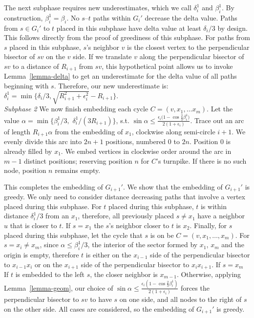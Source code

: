 \documentclass[11pt]{article}
\begin{document}
The next subphase requires new underestimates, which we call $\delta^1_{i}$ 
and $\beta^1_i$. By construction, $\beta^1_i = \beta_i$. 
No $s$--$t$ paths within $G_i'$ decrease the delta value.
Paths from $s\in G_i'$ to $t$ placed in this subphase have delta value at 
least $\delta_i/3$ by design.
\ifFull This follows directly from the proof of greediness of this 
subphase.\fi
For paths from $s$ placed in this subphase, $s$'s neighbor $v$ is 
the closest vertex to the perpendicular bisector 
of $sv$ on the $v$ side. If we translate $v$ along the perpendicular bisector of $sv$ 
to a distance of $R_{i+1}$ from $sv$, this hypothetical point allows us to invoke 
Lemma~\ref{lemma-delta} to get an underestimate for the delta value of all 
paths beginning with $s$. Therefore, our new underestimate is: 
$\delta^1_{i} = \min\{\delta_i/3, \sqrt{R_{i+1}^2 + \epsilon_i^2} - R_{i+1}\}$.\\ 

\noindent\emph{Subphase 2} We now finish embedding each cycle 
$C = (v, x_1,\ldots x_m)$. Let the value $\alpha = \min\{\beta^1_{i}/3,$ $\delta^1_{i}/(3R_{i+1})\}$, 
s.t. $\sin{\alpha} \leq 
\frac{\epsilon_i(1-\cos{\frac{2}{3}\beta^1_i)}}{2(1+\epsilon_i)}$.  
Trace out an arc of length $R_{i+1}\alpha$ from the embedding of $x_1$, clockwise
along semi-circle $i+1$. We evenly divide this arc into $2n+1$ 
positions, numbered $0$ to $2n$. Position $0$ is already filled by $x_1$. 
We embed vertices in clockwise order around the arc in $m-1$ 
distinct positions; reserving position $n$ for $C$'s turnpike. If 
there is no such node, position $n$ remains empty.

This completes the embedding of $G_{i+1}'$. We show that the embedding of 
$G_{i+1}'$ is greedy. We only need to consider distance decreasing paths 
that involve a vertex placed during this subphase. For $t$ placed during
this subphase, $t$ is within distance $\delta^1_{i}/3$ from an $x_1$, 
therefore, all previously placed $s \neq x_1$ have a neighbor $u$ that is closer 
to $t$. If $s=x_1$ the $s$'s neighbor closer to $t$ is $x_2$. 
Finally, for $s$ placed during this subphase, let the cycle that 
$s$ is on be $C=(v, x_1,\ldots,x_m)$. For $s=x_i\neq x_m$,
since $\alpha \leq \beta^1_i/3$, the interior of the sector formed by 
$x_1$, $x_m$ and the origin is empty, therefore
$t$ is either on the $x_{i-1}$ side of the 
perpendicular bisector to $x_{i-1}x_i$ or on the $x_{i+1}$
side of the perpendicular bisector to $x_ix_{i+1}$.
If $s=x_m$ If $t$ is embedded to the left $s$, the closer neighbor 
is $x_{m-1}$. Otherwise, applying Lemma~\ref{lemma-geom},
our choice of $\sin{\alpha} \leq 
\frac{\epsilon_i(1-\cos{\frac{2}{3}\beta^1_i})}{2(1+\epsilon_i)}$
forces the perpendicular bisector to $sv$ to have $s$ on one side, and
all nodes to the right of $s$ on the other side. All cases are considered,
so the embedding of $G_{i+1}'$ is greedy. 
\end{document}
